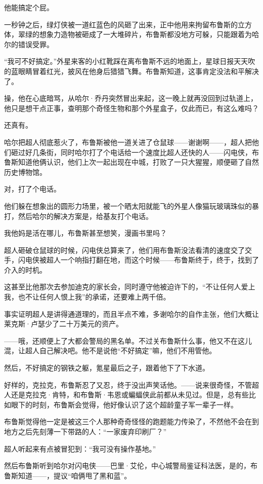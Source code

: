 \documentclass[../main]{subfiles}
\begin{document}
他能搞定个屁。

一秒钟之后，绿灯侠被一道红蓝色的风砸了出来，正中他用来拘留布鲁斯的立方体，翠绿的想象力造物被砸成了一大堆碎片，布鲁斯都没地方可躲，只能跟着为哈尔的错误受罪。

“我可不好搞定。”外星来客的小红靴踩在离布鲁斯不远的地面上，星球日报天天吹的蓝眼睛冒着红光，披风在他身后猎猎飞舞。布鲁斯知道，这事肯定没法和平解决了。

操，他在心底暗骂，从哈尔·乔丹突然冒出来起，这一晚上就再没回到过轨道上，他只是想干点正事，查明那个奇怪生物和那个外星盒子，仅此而已，有这么难吗？

还真有。

哈尔把超人彻底惹火了，布鲁斯被他一道关进了仓鼠球——谢谢啊——，超人把他们砸过好几条街，同时哈尔打了个电话给一个速度比超人还快的人——闪电侠，布鲁斯知道他俩认识，他们上次一起出现在中城，打败了一只大猩猩，顺便砸了自然历史博物馆。

对，打了个电话。

他们躲在想象出的圆形力场里，被一个晒太阳就能飞的外星人像猫玩玻璃珠似的暴打，然后哈尔的解决方案是，给基友打个电话。

我他妈是活在哪儿，布鲁斯甚至想笑，漫画书里吗？

超人砸破仓鼠球的时候，闪电侠总算来了，他们用布鲁斯没法看清的速度交了交手，闪电侠被超人一个响指打翻在地，而这个时候——布鲁斯终于，终于，找到了介入的时机。

这甚至比他那次去参加迪克的家长会，同时遵守他被迫许下的，“不让任何人爱上我，也不让任何人恨上我”的承诺，还要难上两千倍。

事实证明超人是讲得通道理的，而且半点不难，多谢哈尔的自作主张，他们大概让莱克斯·卢瑟少了二十万美元的资产。

——哦，还顺便上了大都会警局的黑名单。不过关布鲁斯什么事，他又不在这儿混，让超人自己解决吧。他不是说他“不好搞定”嘛，他们不用管他。

然后，不好搞定的钢铁之躯，氪星最后之子，跟着他下了下水道。

好样的，克拉克，布鲁斯忍了又忍，终于没出声笑话他。——说来很奇怪，不管超人还是克拉克·肯特，和布鲁斯·韦恩或蝙蝠侠此前都从未见过。但是，总有些比如眼下的时刻，布鲁斯会觉得，他好像认识了这个超龄童子军一辈子一样。

布鲁斯觉得他一定是被这三个人那种奇奇怪怪的跑题能力传染了，不然他不会在到地方之后先刻薄一下带路的人：“一家废弃印刷厂？”

超人听起来有点被冒犯到：“我可没有操作基地。”

然后布鲁斯听到哈尔对闪电侠——巴里·艾伦，中心城警局鉴证科法医，是的，布鲁斯知道——，提议“咱俩甩了黑和蓝”。
\end{document}
